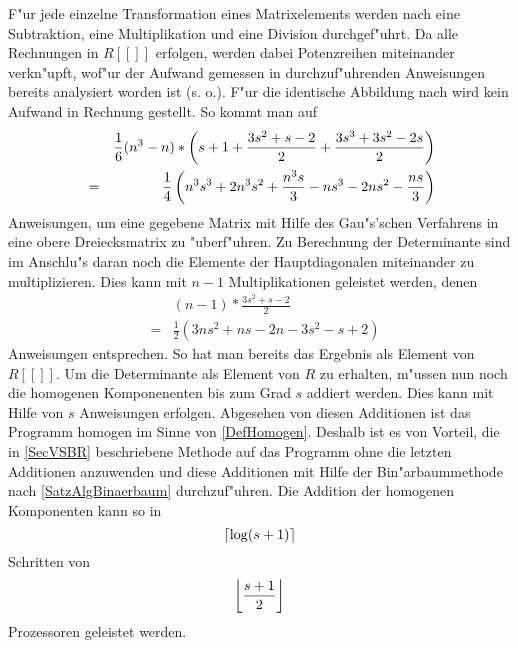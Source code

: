 F"ur jede einzelne Transformation eines Matrixelements
werden nach 
eine Subtraktion, eine Multiplikation und eine Division durchgef"uhrt.
Da alle Rechnungen in $R[[]]$ erfolgen, werden dabei Potenzreihen 
miteinander verkn"upft, wof"ur der Aufwand
gemessen in durchzuf"uhrenden Anweisungen bereits analysiert worden 
ist (s. o.).
F"ur die identische Abbildung nach  wird kein Aufwand
in Rechnung gestellt. So kommt man auf
\begin{eqnarray}
   & & \nonumber
       \frac{1}{6}( n^3 - n) *
       \left(
           s + 1
           + \frac{3s^2 + s - 2}{2}
           + \frac{3s^3 + 3s^2 - 2s}{2}
       \right) \\
  & = & \label{AnwNeueElem}
         \frac{1}{4}
       \left( n^3 s^3 + 2n^3 s^2 + \frac{n^3 s}{3} - n s^3 - 2 n s^2
       - \frac{n s}{3} \right)
\end{eqnarray}
Anweisungen, um eine gegebene Matrix mit Hilfe des Gau"s'schen Verfahrens
in eine obere Dreiecksmatrix zu "uberf"uhren. Zu Berechnung der
Determinante sind im Anschlu"s daran noch die Elemente der Hauptdiagonalen
miteinander zu multiplizieren. Dies kann mit $n-1$ Multiplikationen
geleistet werden, denen
\begin{eqnarray}
   & & \nonumber
     (n-1) * 
     \frac{3s^2 + s - 2}{2} \\
   & = & \label{AnwDiagMult}
     \frac{1}{2} ( 3 n s^2 + n s - 2n - 3 s^2 - s + 2)
\end{eqnarray}
Anweisungen entsprechen. So hat man bereits das Ergebnis als Element
von $R[[]]$. Um die Determinante als Element von $R$ zu erhalten, m"ussen
nun noch die homogenen Komponenenten bis zum Grad $s$ addiert werden.
Dies kann mit Hilfe von $s$ Anweisungen erfolgen. Abgesehen von diesen 
Additionen ist das Programm homogen im Sinne von \ref{DefHomogen}.
Deshalb ist es von Vorteil, die in \ref{SecVSBR} beschriebene Methode
auf das Programm ohne die letzten Additionen anzuwenden und diese
Additionen mit Hilfe der Bin"arbaummethode nach \ref{SatzAlgBinaerbaum}
durchzuf"uhren. Die Addition der homogenen Komponenten kann so in 
\[ \left\lceil \log(s+1) \right\rceil \] Schritten von \[ \left\lfloor \frac{s+1}{2} \right\rfloor \]
Prozessoren geleistet werden.

